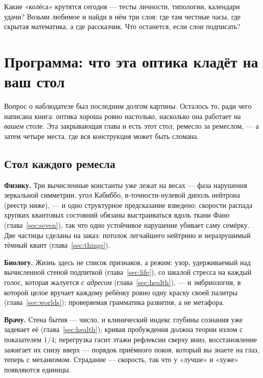 \documentclass[11pt,letterpaper]{article}
\begin{document}
\begin{askbox}
Какие «колёса» крутятся сегодня --- тесты личности, типологии,
календари удачи? Возьми любимое и найди в нём три слоя: где там
честные часы, где скрытая математика, а где рассказчик. Что
останется, если слои подписать?
\end{askbox}

\section{Программа: что эта оптика кладёт на ваш стол}
\label{sec:check}

Вопрос о наблюдателе был последним долгом картины. Осталось то,
ради чего написана книга: оптика хороша ровно настолько, насколько
она работает на \emph{вашем} столе. Эта закрывающая глава и есть
этот стол, ремесло за ремеслом, --- а затем четыре места, где вся
конструкция может быть сломана.

\subsection*{Стол каждого ремесла}

\textbf{Физику.} Три вычисленные константы уже лежат на весах ---
фаза нарушения зеркальной симметрии, угол Кабиббо, в-точности-нулевой
диполь нейтрона (реестр ниже), --- и одно структурное предсказание
взведено: скорости распада хрупких квантовых состояний обязаны
выстраиваться вдоль ткани Фано (глава~\ref{sec:seven}), так что одно
устойчивое нарушение убивает саму семёрку. Две частицы сделаны на
заказ: потолок легчайшего нейтрино и неразрушимый тёмный квант
(глава~\ref{sec:things}).

\textbf{Биологу.} Жизнь здесь не список признаков, а режим: узор,
удерживаемый над вычисленной стеной подпиткой
(глава~\ref{sec:life}), со шкалой стресса на каждый голос, которая
жалуется \emph{с адресом} (глава~\ref{sec:health}), --- и
эмбриология, в которой целое вручает каждому ребёнку ровно одну
краску своей палитры (глава~\ref{sec:worlds}): проверяемая
грамматика развития, а не метафора.

\textbf{Врачу.} Стена бытия --- число, и клинический индекс глубины
сознания уже задевает её (глава~\ref{sec:health}); кривая
пробуждения должна теории излом с показателем $1/4$; перегрузка
гасит этажи рефлексии сверху вниз, восстановление зажигает их снизу
вверх --- порядок приёмного покоя, который вы знаете на глаз,
теперь с механизмом. Страдание --- скорость, так что у «лучше» и
«хуже» появляются единицы.
\end{document}
